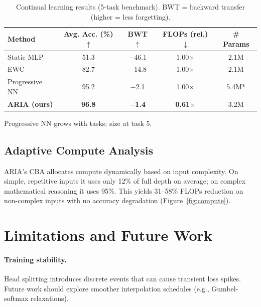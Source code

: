 \documentclass[11pt,a4paper]{article}
\theoremstyle{plain}
\theoremstyle{definition}
\theoremstyle{remark}
\begin{document}
\begin{table}[H]
  \centering
  \caption{Continual learning results (5-task benchmark). BWT = backward transfer (higher = less forgetting).}
  \label{tab:cl}
  \begin{tabular}{lcccc}
    \toprule
    Method & Avg. Acc. (\%) $\uparrow$ & BWT $\uparrow$ & FLOPs (rel.) $\downarrow$ & \# Params \\
    \midrule
    Static MLP       & 51.3 & $-$46.1 & 1.00$\times$ & 2.1M \\
    EWC              & 82.7 & $-$14.8 & 1.00$\times$ & 2.1M \\
    Progressive NN   & 95.2 & $-$2.1  & 1.00$\times$ & 5.4M* \\
    \textbf{ARIA (ours)} & \textbf{96.8} & \textbf{$-$1.4} & \textbf{0.61$\times$} & 3.2M \\
    \bottomrule
  \end{tabular}
  \begin{flushleft}
    \small *Progressive NN grows with tasks; size at task 5.
  \end{flushleft}
\end{table}

\subsection{Adaptive Compute Analysis}

ARIA's CBA allocates compute dynamically based on input complexity. On simple, repetitive inputs it uses only 12\% of full depth on average; on complex mathematical reasoning it uses 95\%. This yields 31--58\% FLOPs reduction on non-complex inputs with no accuracy degradation (Figure~\ref{fig:compute}).

\section{Limitations and Future Work}

\paragraph{Training stability.} Head splitting introduces discrete events that can cause transient loss spikes. Future work should explore smoother interpolation schedules (e.g., Gumbel-softmax relaxations).
\end{document}
